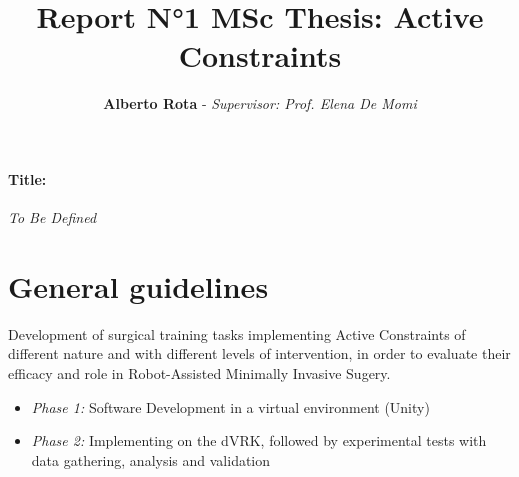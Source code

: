 \documentclass{article}
\title{\textbf{Report N°1 MSc Thesis: Active Constraints}}
\author{\textbf{Alberto Rota} - \textit{Supervisor: Prof. Elena De Momi}}
\date{}
\begin{document}
\maketitle
\paragraph{Title:} \textit{To Be Defined}
\section*{General guidelines}
    Development of surgical training tasks implementing Active Constraints of
    different nature and with different levels of intervention, in order to
    evaluate their efficacy and role in Robot-Assisted Minimally Invasive Sugery.
    \begin{itemize}
        \item \textit{Phase 1: }Software Development in a virtual environment (Unity)
        \item \textit{Phase 2: }Implementing on the dVRK, followed by
        experimental tests with data gathering, analysis and validation
    \end{itemize}
\end{document}

